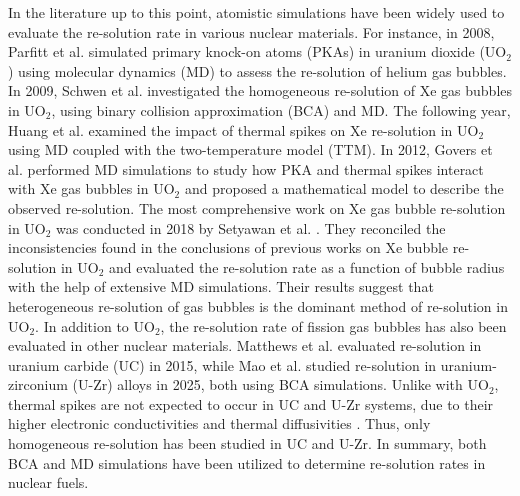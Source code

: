 \documentclass[review]{elsarticle}
\begin{document}
In the literature up to this point, atomistic simulations have been widely used to evaluate the re-solution rate in various nuclear materials. For instance, in 2008, Parfitt et al. \cite{parfitt2008} simulated primary knock-on atoms (PKAs) in uranium dioxide (UO$_2$) using molecular dynamics (MD) to assess the re-solution of helium gas bubbles. In 2009, Schwen et al. \cite{schwen2009md} investigated the homogeneous re-solution of Xe gas bubbles in UO$_2$, using binary collision approximation (BCA) and MD. The following year, Huang et al. \cite{huang2010md} examined the impact of thermal spikes on Xe re-solution in UO$_2$ using MD coupled with the two-temperature model (TTM). In 2012, Govers et al. \cite{govers2012} performed MD simulations to study how PKA and thermal spikes interact with Xe gas bubbles in UO$_2$ and proposed a mathematical model to describe the observed re-solution. The most comprehensive work on Xe gas bubble re-solution in UO$_2$ was conducted in 2018 by Setyawan et al. \cite{setyawan2018}. They reconciled the inconsistencies found in the conclusions of previous works on Xe bubble re-solution in UO$_2$ and evaluated the re-solution rate as a function of bubble radius with the help of extensive MD simulations. Their results suggest that heterogeneous re-solution of gas bubbles is the dominant method of re-solution in UO$_2$. In addition to UO$_2$, the re-solution rate of fission gas bubbles has also been evaluated in other nuclear materials. Matthews et al. \cite{matthews2015} evaluated re-solution in uranium carbide (UC) in 2015, while Mao et al. \cite{mao2025} studied re-solution in uranium-zirconium (U-Zr) alloys in 2025, both using BCA simulations. Unlike with UO$_2$, thermal spikes are not expected to occur in UC and U-Zr systems, due to their higher electronic conductivities and thermal diffusivities \cite{ronchi1986, matthews2015, mao2025}. Thus, only homogeneous re-solution has been studied in UC and U-Zr. In summary, both BCA and MD simulations have been utilized to determine re-solution rates in nuclear fuels.
\end{document}
